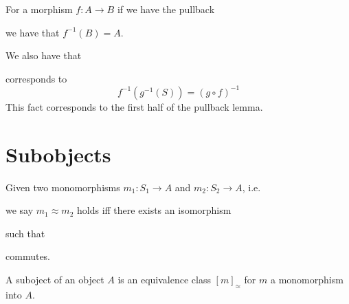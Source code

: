 \begin{remark}
For a morphism $f: A \to B$ if we have the pullback
\begin{center}
\end{center}
we have that $f^{-1}(B) = A$.
\end{remark}

\begin{remark}
We also have that
\begin{center}
\end{center}
corresponds to 
\[ f^{-1}(g^{-1}(S)) = (g \circ f)^{-1} \]
This fact corresponds to the first half of the pullback lemma.
\end{remark}

\section{Subobjects}
\begin{definition}[$\approx$]
	Given two monomorphisms $m_1: S_1 \to A$ and $m_2: S_2 \to A$, i.e.
	\begin{center}
	\end{center}
\end{definition}
we say $m_1 \approx m_2$ holds iff there exists an isomorphism 
 such that
\begin{center}
\end{center}
commutes.

\begin{definition}[Suboject]
	A suboject of an object $A$ is an equivalence class $[m]_{\approx}$ for $m$ a monomorphism into $A$.
\end{definition}

